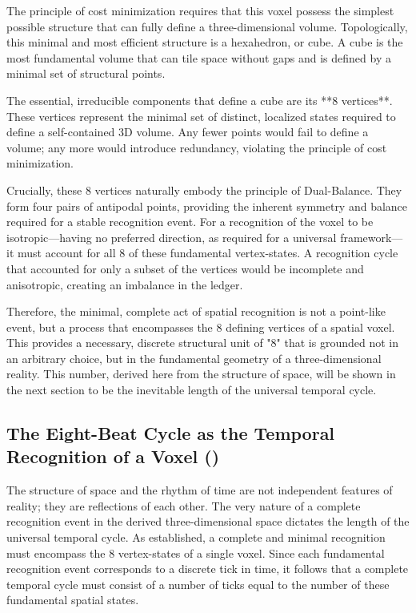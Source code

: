 \documentclass[11pt,a4paper]{article}
\begin{document}
The principle of cost minimization requires that this voxel possess the simplest possible structure that can fully define a three-dimensional volume. Topologically, this minimal and most efficient structure is a hexahedron, or cube. A cube is the most fundamental volume that can tile space without gaps and is defined by a minimal set of structural points.

The essential, irreducible components that define a cube are its **8 vertices**. These vertices represent the minimal set of distinct, localized states required to define a self-contained 3D volume. Any fewer points would fail to define a volume; any more would introduce redundancy, violating the principle of cost minimization.

Crucially, these 8 vertices naturally embody the principle of Dual-Balance. They form four pairs of antipodal points, providing the inherent symmetry and balance required for a stable recognition event. For a recognition of the voxel to be isotropic—having no preferred direction, as required for a universal framework—it must account for all 8 of these fundamental vertex-states. A recognition cycle that accounted for only a subset of the vertices would be incomplete and anisotropic, creating an imbalance in the ledger.

Therefore, the minimal, complete act of spatial recognition is not a point-like event, but a process that encompasses the 8 defining vertices of a spatial voxel. This provides a necessary, discrete structural unit of "8" that is grounded not in an arbitrary choice, but in the fundamental geometry of a three-dimensional reality. This number, derived here from the structure of space, will be shown in the next section to be the inevitable length of the universal temporal cycle.

\subsection{The Eight-Beat Cycle as the Temporal Recognition of a Voxel ()}
The structure of space and the rhythm of time are not independent features of reality; they are reflections of each other. The very nature of a complete recognition event in the derived three-dimensional space dictates the length of the universal temporal cycle. As established, a complete and minimal recognition must encompass the 8 vertex-states of a single voxel. Since each fundamental recognition event corresponds to a discrete tick in time, it follows that a complete temporal cycle must consist of a number of ticks equal to the number of these fundamental spatial states.
\end{document}
